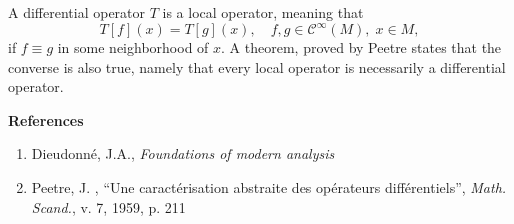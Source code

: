 \documentclass{article}
\newcommand{\cfty}{\mathcal{C}^\infty}
\begin{document}
A differential operator $T$ is a local operator, meaning that
$$T[f](x) = T[g](x),\quad f,g\in\cfty(M),\; x\in M,$$
if $f\equiv g$ in some neighborhood of $x$.  A theorem, proved by
Peetre states that the converse is also true, namely that every local
operator is necessarily a differential operator.

\bigskip
{\bf References}

\begin{enumerate}
\item Dieudonn\'e, J.A., {\em Foundations of modern analysis}
\item Peetre, J. , ``Une caract\'erisation abstraite des op\'erateurs
  diff\'erentiels'', {\em Math. Scand.}, v. 7, 1959, p. 211
\end{enumerate}
\end{document}
